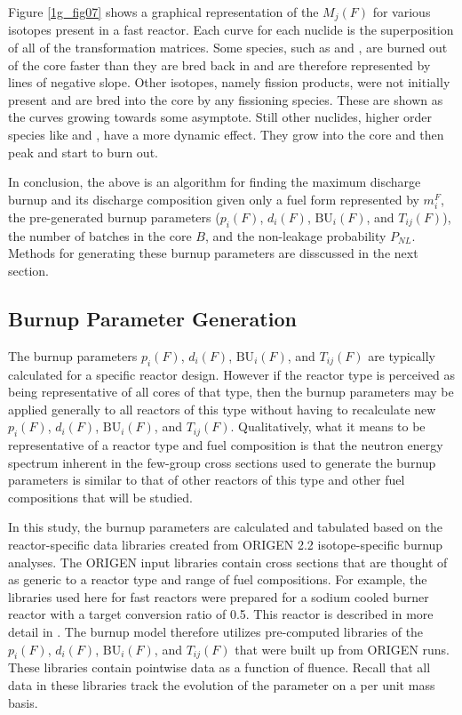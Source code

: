 Figure \ref{1g_fig07} shows a graphical representation of the $M_j(F)$ for various isotopes present 
in a fast reactor.  Each curve for each nuclide is the superposition of all of the transformation 
matrices.  Some species, such as  and , 
are burned out of the core faster than they are bred back in and are therefore represented by lines of 
negative slope.  Other isotopes, namely fission products, were not initially present and are bred into 
the core by any fissioning species.  These are shown as the curves growing towards some asymptote.  
Still other nuclides, higher order species like  and , have a more dynamic effect.  
They grow into the core and then peak and start to burn out.  

In conclusion, the above is an algorithm for finding the maximum discharge burnup and its discharge 
composition given only a fuel form represented by $m_i^F$, the pre-generated burnup parameters ($p_i(F)$, 
$d_i(F)$, $\mbox{BU}_i(F)$, and $T_{ij}(F)$), the number of batches in the core $B$, and the non-leakage 
probability $P_{NL}$.  Methods for generating these burnup parameters are disscussed in the   
next section. 



\subsection{Burnup Parameter Generation}
\label{1g_sec:gen_BU_param}
The burnup parameters $p_i(F)$, $d_i(F)$, $\mbox{BU}_i(F)$, and $T_{ij}(F)$ are typically calculated 
for a specific reactor design.  However if the reactor type is perceived as being representative of 
all cores of that type, then the burnup parameters may be applied generally to all reactors of this 
type without having to recalculate new $p_i(F)$, $d_i(F)$, $\mbox{BU}_i(F)$, and $T_{ij}(F)$.  
Qualitatively, what it means to be representative of a reactor type and fuel composition is that the 
neutron energy spectrum inherent in the few-group cross sections used to generate the burnup parameters 
is similar to that of other reactors of this type and other fuel compositions that will be studied.   

In this study, the burnup parameters are calculated and tabulated based on the reactor-specific data 
libraries created from ORIGEN 2.2 \cite{Croff2002} isotope-specific burnup analyses.  The ORIGEN 
input libraries contain cross sections that are thought of as generic to a reactor type and range of 
fuel compositions.  For example, the libraries used here for fast reactors were prepared for a sodium 
cooled burner reactor with a target conversion ratio of 0.5.  This reactor is described in more detail 
in \cite{INL/CON-07-12478}.  The burnup model therefore utilizes pre-computed libraries of the 
$p_i(F)$, $d_i(F)$, $\mbox{BU}_i(F)$, and $T_{ij}(F)$ that were built up from ORIGEN runs.  
These libraries contain pointwise data as a function of fluence.  Recall that all data in these 
libraries track the evolution of the parameter on a per unit mass basis.


